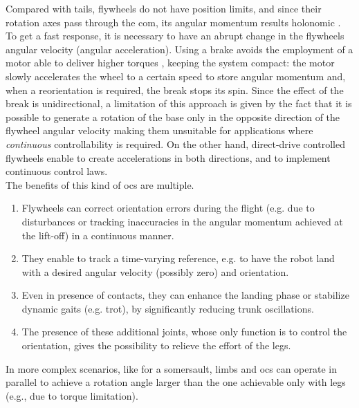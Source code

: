 \documentclass[sensors,article,submit,pdftex,moreauthors]{Definitions/mdpi}
\begin{document}
Compared with tails, flywheels do not have position limits, and since their rotation axes pass through the \gls{com}, its angular momentum results holonomic \cite{machairas2015quadruped}.
To get a fast response, it is necessary to have an abrupt change in the flywheels angular velocity (angular acceleration).
Using a brake avoids the employment of a motor able to deliver higher torques \cite{gajamohan2012cubli}, 
keeping the system compact: the motor slowly accelerates the wheel to a certain speed to store angular momentum and, when a reorientation is required, the break stops its spin.
Since the effect of the break is unidirectional, a limitation of this approach is given by the fact that it is possible to generate a rotation of the base only in the opposite direction of the flywheel angular velocity making them unsuitable for applications where \textit{continuous} controllability is required. On the other hand, direct-drive controlled flywheels enable to create accelerations in both directions,  and  to implement continuous control laws. \\
The benefits of this kind of \gls{ocs} are multiple. 
\begin{enumerate}
\item Flywheels can correct orientation errors during the flight (e.g. due to disturbances or tracking inaccuracies in the angular momentum achieved at the lift-off)   %
in a continuous manner. 
\item They enable to track a time-varying reference, e.g. to have the robot land with a desired angular velocity (possibly zero) and orientation.
\item  Even in presence of contacts, they can enhance the landing phase or stabilize dynamic gaits (e.g. trot), by significantly reducing trunk oscillations.  
\item  The presence of these additional joints, whose only function is to control the orientation, gives the possibility to relieve the effort of the legs.
\end{enumerate}
In more complex scenarios, like for a somersault, limbs and \gls{ocs} can operate in parallel to achieve a rotation angle larger than the one achievable only with legs (e.g., due to torque limitation). 
\end{document}
